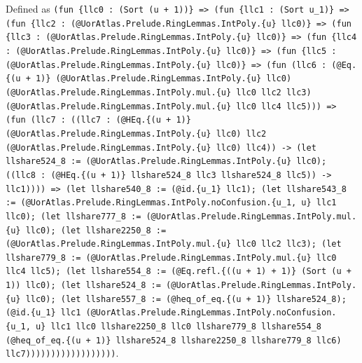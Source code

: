 \documentclass[11pt]{article}
\begin{document}
\noindent Defined as \texttt{(fun \{llc0 : (Sort (u + 1))\} => (fun \{llc1 : (Sort u\_1)\} => (fun \{llc2 : (@UorAtlas.Prelude.RingLemmas.IntPoly.\{u\} llc0)\} => (fun \{llc3 : (@UorAtlas.Prelude.RingLemmas.IntPoly.\{u\} llc0)\} => (fun \{llc4 : (@UorAtlas.Prelude.RingLemmas.IntPoly.\{u\} llc0)\} => (fun \{llc5 : (@UorAtlas.Prelude.RingLemmas.IntPoly.\{u\} llc0)\} => (fun (llc6 : (@Eq.\{(u + 1)\} (@UorAtlas.Prelude.RingLemmas.IntPoly.\{u\} llc0) (@UorAtlas.Prelude.RingLemmas.IntPoly.mul.\{u\} llc0 llc2 llc3) (@UorAtlas.Prelude.RingLemmas.IntPoly.mul.\{u\} llc0 llc4 llc5))) => (fun (llc7 : ((llc7 : (@HEq.\{(u + 1)\} (@UorAtlas.Prelude.RingLemmas.IntPoly.\{u\} llc0) llc2 (@UorAtlas.Prelude.RingLemmas.IntPoly.\{u\} llc0) llc4)) -> (let llshare524\_8 := (@UorAtlas.Prelude.RingLemmas.IntPoly.\{u\} llc0); ((llc8 : (@HEq.\{(u + 1)\} llshare524\_8 llc3 llshare524\_8 llc5)) -> llc1)))) => (let llshare540\_8 := (@id.\{u\_1\} llc1); (let llshare543\_8 := (@UorAtlas.Prelude.RingLemmas.IntPoly.noConfusion.\{u\_1, u\} llc1 llc0); (let llshare777\_8 := (@UorAtlas.Prelude.RingLemmas.IntPoly.mul.\{u\} llc0); (let llshare2250\_8 := (@UorAtlas.Prelude.RingLemmas.IntPoly.mul.\{u\} llc0 llc2 llc3); (let llshare779\_8 := (@UorAtlas.Prelude.RingLemmas.IntPoly.mul.\{u\} llc0 llc4 llc5); (let llshare554\_8 := (@Eq.refl.\{((u + 1) + 1)\} (Sort (u + 1)) llc0); (let llshare524\_8 := (@UorAtlas.Prelude.RingLemmas.IntPoly.\{u\} llc0); (let llshare557\_8 := (@heq\_of\_eq.\{(u + 1)\} llshare524\_8); (@id.\{u\_1\} llc1 (@UorAtlas.Prelude.RingLemmas.IntPoly.noConfusion.\{u\_1, u\} llc1 llc0 llshare2250\_8 llc0 llshare779\_8 llshare554\_8 (@heq\_of\_eq.\{(u + 1)\} llshare524\_8 llshare2250\_8 llshare779\_8 llc6) llc7))))))))))))))))))}.\par
\end{document}
